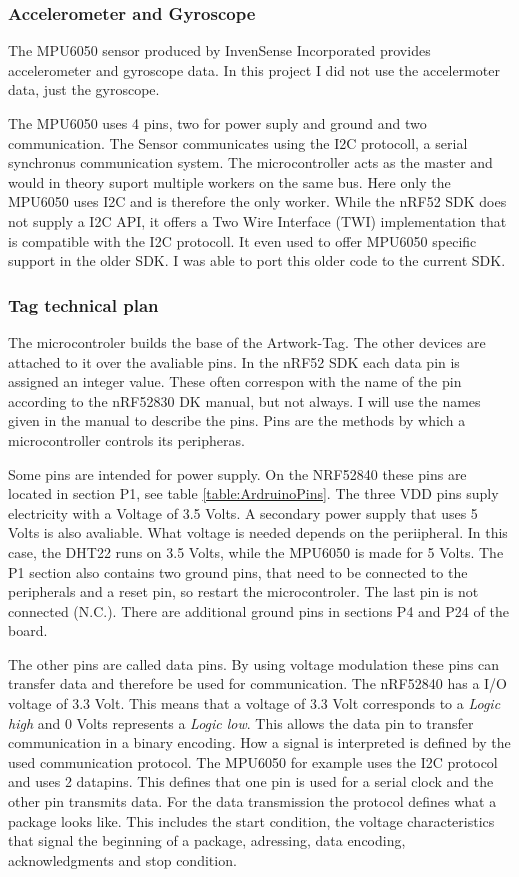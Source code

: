 \subsubsection{Accelerometer and Gyroscope}
The MPU6050 sensor produced by InvenSense Incorporated provides accelerometer and gyroscope data.
 In this project I did not use the accelermoter data, just the gyroscope.

The MPU6050 uses 4 pins, two for power suply and ground and two communication.
The Sensor communicates using the I2C protocoll, a serial synchronus communication system.
The microcontroller acts as the master and would in theory suport multiple workers on the same bus. 
Here only the MPU6050 uses I2C and is therefore the only worker.
While the nRF52 SDK does not supply a I2C API, it offers a Two Wire Interface (TWI) implementation that is compatible with the I2C protocoll.
It even used to offer MPU6050 specific support in the older SDK. 
I was able to port this older code to the current SDK.

\subsubsection{Tag technical plan}
The microcontroler builds the base of the Artwork-Tag. 
The other devices are attached to it over the avaliable pins.
In the nRF52 SDK each data pin is assigned an integer value. 
These often correspon with the name of the pin according to the nRF52830 DK manual, but not always.
I will use the names given in the manual to describe the pins.
Pins are the methods by which a microcontroller controls its peripheras.

Some pins are intended for power supply.
On the NRF52840 these pins are located in section P1, see table \ref{table:ArdruinoPins}.
The three VDD pins suply electricity with a Voltage of 3.5 Volts.
A secondary power supply that uses 5 Volts is also avaliable.
What voltage is needed depends on the periipheral.
In this case, the DHT22 runs on 3.5 Volts, while the MPU6050 is made for 5 Volts.
The P1 section also contains two ground pins, that need to be connected to the peripherals and a reset pin, so restart the microcontroler.
The last pin is not connected (N.C.).
There are additional ground pins in sections P4 and P24 of the board.

The other pins are called data pins.
By using voltage modulation these pins can transfer data and therefore be used for communication.
The nRF52840 has a I/O voltage of 3.3 Volt.
This means that a voltage of 3.3 Volt corresponds to a \textit{Logic high} and 0 Volts represents a \textit{Logic low}.
This allows the data pin to transfer communication in a binary encoding.
How a signal is interpreted is defined by the used communication protocol.
The MPU6050 for example uses the I2C protocol and uses 2 datapins.
This defines that one pin is used for a serial clock and the other pin transmits data.
For the data transmission the protocol defines what a package looks like.
This includes the start condition, the voltage characteristics that signal the beginning of a package, adressing, data encoding, acknowledgments and stop condition.


